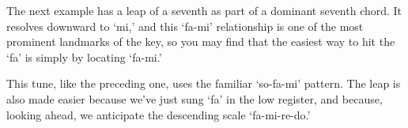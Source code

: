\documentclass{sight}
\begin{document}
\pagebreak[3]\par
\vspace{5mm}\begin{samepage}The next example has a leap of a seventh as part of a dominant seventh chord. It resolves downward to `mi,' and this `fa-mi' relationship is one of the most prominent landmarks of the key, so you may find that the easiest way to hit the `fa' is simply by locating `fa-mi.'\\


\pagebreak[3]\par
\par
{}
%
%
\label{tune:309}%
{%
\parindent 0pt
\noindent
\ifx\preLilyPondExample \undefined
\else
  \expandafter\preLilyPondExample
\fi
\def\lilypondbook{}%

\ifx\postLilyPondExample \undefined
\else
  \expandafter\postLilyPondExample
\fi
}
\end{samepage}


\pagebreak[3]\par
\vspace{5mm}\begin{samepage}This tune, like the preceding one, uses the familiar `so-fa-mi' pattern. The leap is also made easier because we've just sung `fa' in the low register, and because, looking ahead, we anticipate the descending scale `fa-mi-re-do.'\\


\pagebreak[3]\par
\par
{}
%
\label{tune:310}%
{%
\parindent 0pt
\noindent
\ifx\preLilyPondExample \undefined
\else
  \expandafter\preLilyPondExample
\fi
\def\lilypondbook{}%

\ifx\postLilyPondExample \undefined
\else
  \expandafter\postLilyPondExample
\fi
}
\end{samepage}
\end{document}
